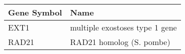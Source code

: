 \begin{tabular}{ll}
\toprule
Gene Symbol &                           Name \\
\midrule
       EXT1 & multiple exostoses type 1 gene \\
      RAD21 &       RAD21 homolog (S. pombe) \\
\bottomrule
\end{tabular}
